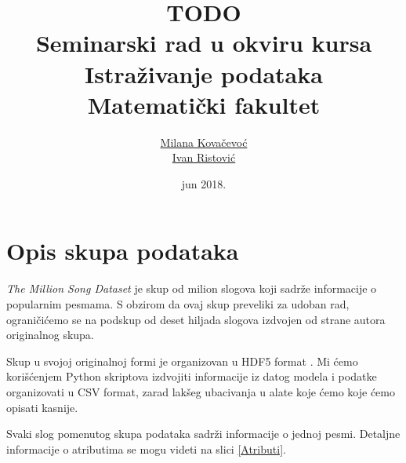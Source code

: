 \documentclass[a4paper]{article}
\begin{document}
\title{TODO\\ \small{Seminarski rad u okviru kursa\\Istra\v{z}ivanje podataka\\ Matematički fakultet}}

\author{\href{mailto:mi14031@matf.bg.ac.rs}{Milana Kova\v{c}evo\'c}\\\href{mailto:mi14042@matf.bg.ac.rs}{Ivan Ristovi\'c}}
\date{jun 2018.}


\maketitle

\tableofcontents

\newpage


\section{Opis skupa podataka}
\label{sec:Opis skupa podataka}

\emph{The Million Song Dataset} \cite{Dataset} je skup od milion slogova koji sadr\v{z}e informacije o popularnim pesmama. S obzirom da ovaj skup preveliki za udoban rad, ograni\v{c}i\'c{}emo se na podskup od deset hiljada slogova izdvojen od strane autora originalnog skupa.

Skup u svojoj originalnoj formi je organizovan u HDF5 format \cite{HDF5}. Mi \'c{}emo kori\v{s}\'c{}enjem Python skriptova izdvojiti informacije iz datog modela i podatke organizovati u CSV format, zarad lak\v{s}eg ubacivanja u alate koje \'c{}emo koje \'c{}emo opisati kasnije.

Svaki slog pomenutog skupa podataka sadr\v{z}i informacije o jednoj pesmi. Detaljne informacije o atributima se mogu videti na slici \ref{Atributi}.
\end{document}
